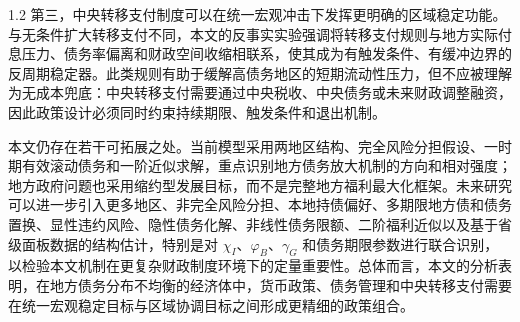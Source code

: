 \documentclass[12pt,UTF8]{ctexart}
\begin{document}
\begin{spacing}{1.2}
		第三，中央转移支付制度可以在统一宏观冲击下发挥更明确的区域稳定功能。与无条件扩大转移支付不同，本文的反事实实验强调将转移支付规则与地方实际付息压力、债务率偏离和财政空间收缩相联系，使其成为有触发条件、有缓冲边界的反周期稳定器。此类规则有助于缓解高债务地区的短期流动性压力，但不应被理解为无成本兜底：中央转移支付需要通过中央税收、中央债务或未来财政调整融资，因此政策设计必须同时约束持续期限、触发条件和退出机制。
		
		本文仍存在若干可拓展之处。当前模型采用两地区结构、完全风险分担假设、一时期有效滚动债务和一阶近似求解，重点识别地方债务放大机制的方向和相对强度；地方政府问题也采用缩约型发展目标，而不是完整地方福利最大化框架。未来研究可以进一步引入更多地区、非完全风险分担、本地持债偏好、多期限地方债和债务置换、显性违约风险、隐性债务化解、非线性债务限额、二阶福利近似以及基于省级面板数据的结构估计，特别是对 $\chi_I$、$\varphi_B$、$\gamma_G$ 和债务期限参数进行联合识别，以检验本文机制在更复杂财政制度环境下的定量重要性。总体而言，本文的分析表明，在地方债务分布不均衡的经济体中，货币政策、债务管理和中央转移支付需要在统一宏观稳定目标与区域协调目标之间形成更精细的政策组合。
		
	\end{spacing}
	
\end{document}
